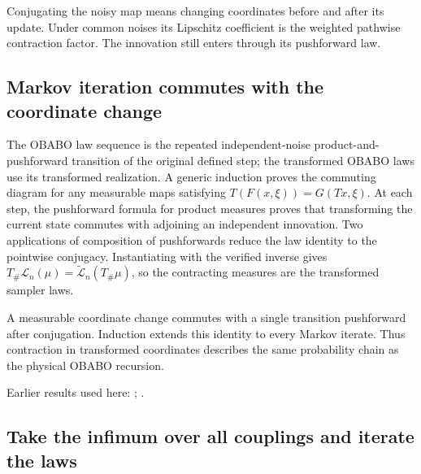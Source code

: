 \documentclass[11pt,a4paper]{report}
\begin{document}
Conjugating the noisy map means changing coordinates before and after its update. Under common noises its Lipschitz coefficient is the weighted pathwise contraction factor. The innovation still enters through its pushforward law.

\subsection{\texorpdfstring{Markov iteration commutes with the coordinate change}{Markov iteration commutes with the coordinate change}}
\label{report-step-KineticLangevin-OBABOLaw-lean-3}


The OBABO law sequence is the repeated independent-noise product-and-pushforward transition of the original defined step; the transformed OBABO laws use its transformed realization. A generic induction proves the commuting diagram for any measurable maps satisfying \(T(F(x,\xi))=G(Tx,\xi)\). At each step, the pushforward formula for product measures proves that transforming the current state commutes with adjoining an independent innovation. Two applications of composition of pushforwards reduce the law identity to the pointwise conjugacy. Instantiating with the verified inverse gives \(T_\#\mathcal L_n(\mu)=\widetilde{\mathcal L}_n(T_\#\mu)\), so the contracting measures are the transformed sampler laws.



A measurable coordinate change commutes with a single transition pushforward after conjugation. Induction extends this identity to every Markov iterate. Thus contraction in transformed coordinates describes the same probability chain as the physical OBABO recursion.



Earlier results used here: \cite[Section~3.33.11]{LangevinLean2026ULASC}; \cite[Section~3.33.6]{LangevinLean2026ULASC}.
\subsection{\texorpdfstring{Take the infimum over all couplings and iterate the laws}{Take the infimum over all couplings and iterate the laws}}
\label{report-step-KineticLangevin-OBABOLaw-lean-4}
\end{document}
